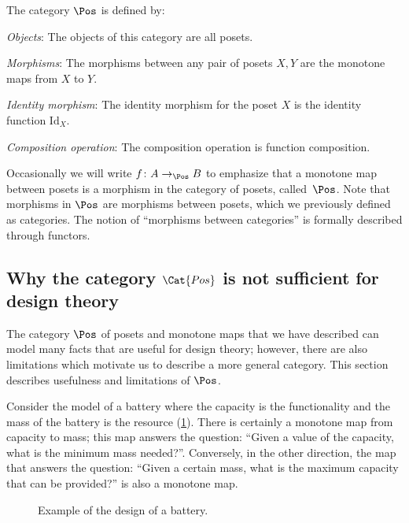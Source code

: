 \begin{definition}
    The category $\Pos$ is defined by:
    \begin{compactenum}
    \item \emph{Objects}: The objects of this category are all posets.
    \item \emph{Morphisms}: The morphisms between any pair of posets $X, Y$
    are the monotone maps from $X$ to $Y$.
    \item \emph{Identity morphism}:  The identity morphism for the poset $X$
    is the identity function $\text{Id}_X$.
    \item \emph{Composition operation}: The composition operation is function
    composition.
    \end{compactenum}
\end{definition}

Occasionally we will write $f \colon A \to_{\Pos} B$ to emphasize that a monotone map between posets is a morphism in the category of posets, called~$\Pos$. Note that morphisms in $\Pos$ are morphisms between posets, which we previously defined as categories. The notion of ``morphisms between categories'' is formally described through functors.


\subsection{Why the category $\Cat{Pos}$ is not sufficient for design theory}


The category $\Pos$ of posets and monotone maps that we have described
can model many facts that are useful for design theory; however, there are also
limitations which motivate us to describe a more general category.
This section describes usefulness and limitations of $\Pos$.

\begin{example}[Battery]
    Consider the model of a battery where the capacity is the functionality
    and the mass of the battery is the resource (\cref{fig:battery-example}). There is certainly
    a monotone map from capacity to mass; this map answers the question: ``Given a value of the capacity, what is the minimum mass needed?''. Conversely,
    in the other direction, the map that answers the question: ``Given a certain mass, what is the maximum capacity that can be provided?'' is also
    a monotone map.
\end{example}

\begin{figure}[h!]
    \centering
    \caption{Example of the design of a battery. \label{fig:battery-example}}
\end{figure}

